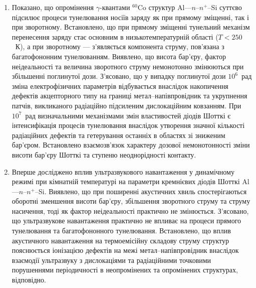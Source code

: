 \begin{enumerate}[leftmargin=0cm,itemindent=3em]
\item
     Показано, що опромінення $\gamma$-квантами $^{60}$Co структур Al---$n$--$n^+$--Si суттєво підсилює процеси тунелювання носіїв заряду як при прямому зміщенні, так і при зворотному.
     Встановлено, що при прямому зміщенні тунельний механізм перенесення заряду стає основним в низькотемпературній області ($T<250$~К),
а при зворотному --- з'являється компонента струму, пов'язана з багатофононним тунелюванням.
 Виявлено, що висота бар'єру, фактор неідеальності та величина зворотного струму немонотонно змінюються при збільшенні поглинутої дози.
З'ясовано, що у випадку поглинутої дози $10^6$~рад зміна
електрофізичних
параметрів відбувається внаслідок накопичення дефектів акцепторного типу на границі метал--напівпровідник та укрупнення патчів, викликаного радіаційно підсиленим дислокаційним ковзанням.
При $10^7$~рад
визначальними механізмами змін властивостей діодів Шотткі є інтенсифікація процесів тунелювання внаслідок утворення значної кількості радіаційних дефектів та гетерування останніх в областях зі зниженим бар'єром.
Встановлено взаємозв'язок характеру дозової немонотонності зміни висоти бар'єру Шотткі та ступеню неоднорідності контакту.


\item
Вперше досліджено вплив ультразвукового навантаження у динамічному режимі при кімнатній температурі на параметри кремнієвих діодів Шотткі Al---$n$--$n^+$--Si.
Виявлено, що при поширенні акустичних хвиль спостерігаються оборотні зменшення висоти бар'єру,
збільшення зворотного струму та струму насичення, тоді як фактор неідеальності практично не змінюється.
З'ясовано, що ультразвукове навантаження практично не впливає на процеси прямого тунелювання та багатофононного тунелювання.
Встановлено, що вплив акустичного навантаження на термоемісійну складову струму структур пояснюється іонізацією дефектів на межі метал--напівпровідник
  внаслідок взаємодії ультразвуку з дислокаціями та радіаційними точковими порушеннями періодичності в неопромінених та опромінених структурах, відповідно.


\end{enumerate}
